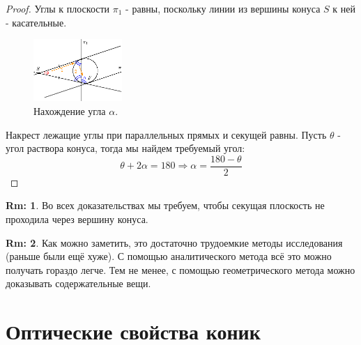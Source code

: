 \documentclass[12pt]{article}
\theoremstyle{definition}
\newtheorem{rem}{Rm:}
\begin{document}
\begin{proof}
	Углы к плоскости $\pi_1$ - равны, поскольку линии из вершины конуса $S$ к ней - касательные.
	\begin{figure}[H]
		\centering
		\includegraphics[width=0.3\textwidth]{ANGL1_16.eps}
		\caption{Нахождение угла $\alpha$.}
		\label{1_16}
	\end{figure}
	Накрест лежащие углы при параллельных прямых и секущей равны. Пусть $\theta$ - угол раствора конуса, тогда мы найдем требуемый угол:
	$$
		\theta + 2\alpha = 180 \Rightarrow \alpha = \dfrac{180 - \theta}{2}
	$$
\end{proof}
\begin{rem}
	Во всех доказательствах мы требуем, чтобы секущая плоскость не проходила через вершину конуса.
\end{rem}

\begin{rem}
	Как можно заметить, это достаточно трудоемкие методы исследования (раньше были ещё хуже). С помощью аналитического метода всё это можно получать гораздо легче. Тем не менее, с помощью геометрического метода можно доказывать содержательные вещи.
\end{rem}

\section*{Оптические свойства коник}
\end{document}
